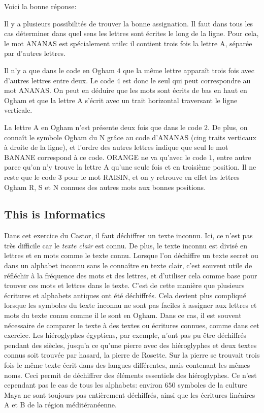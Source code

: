 \documentclass[a4paper,11pt]{report}
\newcommand{\taskGraphicsFolder}{..}
\begin{document}
Voici la bonne réponse:

{\centering%
\par}

Il y a plusieurs possibilités de trouver la bonne assignation. Il faut dans tous les cas déterminer dans quel sens les lettres sont écrites le long de la ligne. Pour cela, le mot ANANAS est spécialement utile: il contient trois fois la lettre A, séparée par d’autres lettres.

Il n’y a que dans le code en Ogham $4$ que la même lettre apparaît trois fois avec d’autres lettres entre deux. Le code $4$ est donc le seul qui peut correspondre au mot ANANAS. On peut en déduire que les mots sont écrits de bas en haut en Ogham et que la lettre A s’écrit avec un trait horizontal traversant le ligne verticale.

La lettre A en Ogham n’est présente deux fois que dans le code $2$. De plus, on connaît le symbole Ogham du N grâce au code d’ANANAS (cing traits verticaux à droite de la ligne), et l’ordre des autres lettres indique que seul le mot BANANE correspond à ce code. ORANGE ne va qu’avec le code $1$, entre autre parce qu’on n’y trouve la lettre A qu’une seule fois et en troisième position. Il ne reste que le code $3$ pour le mot RAISIN, et on y retrouve en effet les lettres Ogham R, S et N connues des autres mots aux bonnes positions.


\subsection*{This is Informatics}

Dans cet exercice du Castor, il faut déchiffrer un texte inconnu. Ici, ce n’est pas très difficile car le \emph{texte clair} est connu. De plus, le texte inconnu est divisé en lettres et en mots comme le texte connu. Lorsque l’on déchiffre un texte secret ou dans un alphabet inconnu sans le connaître en texte clair, c’est souvent utile de réfléchir à la fréquence des mots et des lettres, et d’utiliser cela comme base pour trouver ces mots et lettres dans le texte. C’est de cette manière que plusieurs écritures et alphabets antiques ont été déchiffrés. Cela devient plus compliqué lorsque les symboles du texte inconnu ne sont pas faciles à assigner aux lettres et mots du texte connu comme il le sont en Ogham. Dans ce cas, il est souvent nécessaire de comparer le texte à des textes ou écritures connues, comme dans cet exercice. Les hiéroglyphes égyptiens, par exemple, n’ont pas pu être déchiffrés pendant des siècles, jusqu’a ce qu’une pierre avec des hiéroglyphes et deux textes connus soit trouvée par hasard, la pierre de Rosette. Sur la pierre se trouvait trois fois le même texte écrit dans des langues différentes, mais contenant les mêmes noms. Ceci permit de déchiffrer des éléments essentiels des hiéroglyphes. Ce n’est cependant pas le cas de tous les alphabets: environ $650$ symboles de la culture Maya ne sont toujours pas entièrement déchiffrés, ainsi que les écritures linéaires A et B de la région méditéranéenne.
\end{document}
